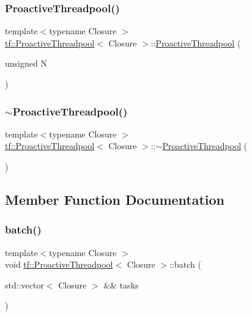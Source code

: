 \subsubsection{\texorpdfstring{Proactive\+Threadpool()}{ProactiveThreadpool()}}
{\footnotesize\ttfamily template$<$typename Closure $>$ \\
\hyperlink{classtf_1_1ProactiveThreadpool}{tf\+::\+Proactive\+Threadpool}$<$ Closure $>$\+::\hyperlink{classtf_1_1ProactiveThreadpool}{Proactive\+Threadpool} (\begin{DoxyParamCaption}\item[{unsigned}]{N }\end{DoxyParamCaption})}

\mbox{\label{classtf_1_1ProactiveThreadpool_aaf941a6716162ecc7f17978b9b2f459f}} 
\subsubsection{\texorpdfstring{$\sim$\+Proactive\+Threadpool()}{~ProactiveThreadpool()}}
{\footnotesize\ttfamily template$<$typename Closure $>$ \\
\hyperlink{classtf_1_1ProactiveThreadpool}{tf\+::\+Proactive\+Threadpool}$<$ Closure $>$\+::$\sim$\hyperlink{classtf_1_1ProactiveThreadpool}{Proactive\+Threadpool} (\begin{DoxyParamCaption}{ }\end{DoxyParamCaption})}



\subsection{Member Function Documentation}
\mbox{\label{classtf_1_1ProactiveThreadpool_a633c010f7aa8183edfaad08be51f6eff}} 
\subsubsection{\texorpdfstring{batch()}{batch()}}
{\footnotesize\ttfamily template$<$typename Closure $>$ \\
void \hyperlink{classtf_1_1ProactiveThreadpool}{tf\+::\+Proactive\+Threadpool}$<$ Closure $>$\+::batch (\begin{DoxyParamCaption}\item[{std\+::vector$<$ Closure $>$ \&\&}]{tasks }\end{DoxyParamCaption})}

